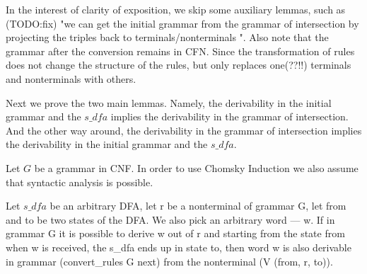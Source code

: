 In the interest of clarity of exposition, we skip some auxiliary lemmas, such as (TODO:fix) "we can get the initial grammar from the grammar of intersection by projecting the triples back to terminals/nonterminals ". Also note that the grammar after the conversion remains in CFN. Since the transformation of rules does not change the structure of the rules, but only replaces one(??!!) terminals and nonterminals with others.









Next we prove the two main lemmas. Namely, the derivability in the initial grammar and the $s\_dfa$ implies the derivability in the grammar of intersection. And the other way around, the derivability in the grammar of intersection implies the derivability in the initial grammar and the $s\_dfa$.

Let $G$ be a grammar in CNF. In order to use Chomsky Induction we also assume that syntactic analysis is possible. 

\begin{theorem}
    Let $s\_dfa$ be an arbitrary DFA, let r be a nonterminal of grammar G, let from and to be two states of the DFA. We also pick an arbitrary word --- w. If in grammar G it is possible to derive w out of r and starting from the state from when w is received, the s\_dfa ends up in state to, then word w is also derivable in grammar (convert\_rules G next) from the nonterminal (V (from, r, to)).
\end{theorem}

